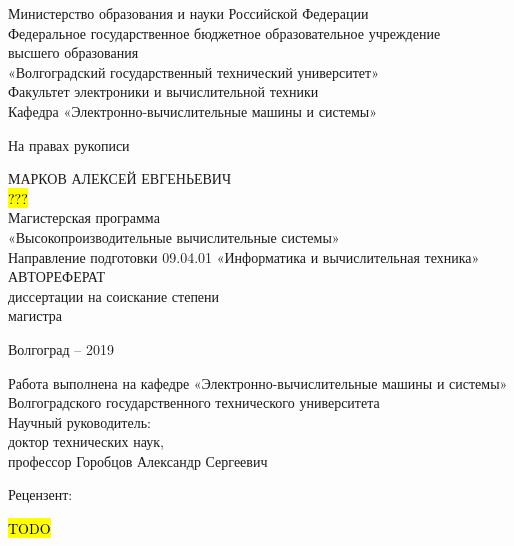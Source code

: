 


\begin{nospasing}
\begin{center}
    Министерство образования и науки Российской Федерации \\
    Федеральное государственное бюджетное образовательное учреждение \\
    высшего образования \\
    «Волгоградский государственный технический университет» \\
    Факультет электроники и вычислительной техники \\
    Кафедра «Электронно-вычислительные машины и системы» \\

    \begin{flushright}
    На правах рукописи \\
    \end{flushright}
    
    МАРКОВ АЛЕКСЕЙ ЕВГЕНЬЕВИЧ \\
    \vspace{1cm}
    \hl{???}\\
    \vspace{1cm}
    Магистерская программа \\
    «Высокопроизводительные вычислительные системы» \\
    Направление подготовки 09.04.01 «Информатика и вычислительная техника» \\
    \vspace{1cm}
    АВТОРЕФЕРАТ \\
    \vspace{1cm}
    диссертации на соискание степени \\
    магистра \\
    
    \vfill
    
    Волгоград – 2019
\end{center}
\end{nospasing}

\newpage

\begin{nospasing}
\noindent
Работа выполнена на кафедре «Электронно-вычислительные машины и
системы» Волгоградского государственного технического университета\\

\noindent
Научный руководитель:\\

    \setlength{\leftskip}{3cm}
    \noindent
    доктор технических наук, \\
    профессор Горобцов Александр Сергеевич \\	
    
    \setlength{\leftskip}{0pt}

\noindent
Рецензент:

    \setlength{\leftskip}{3cm}
    \noindent
    \hl{TODO} \\	
    
    \setlength{\leftskip}{0pt}

\end{nospasing}

